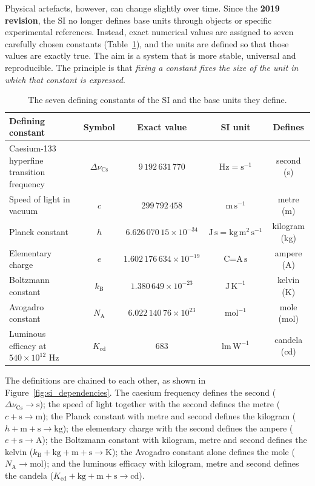 \documentclass[letterpaper,11pt,leqno]{book}
\begin{document}
Physical artefacts, however, can change slightly over time. Since the \textbf{2019 revision}, the SI no longer defines base units through objects or specific experimental references. Instead, exact numerical values are assigned to seven carefully chosen constants (Table~\ref{tab:si_constants}), and the units are defined so that those values are exactly true. The aim is a system that is more stable, universal and reproducible. The principle is that \emph{fixing a constant fixes the size of the unit in which that constant is expressed}.

\begin{table}[!htbp]
\centering
\caption{The seven defining constants of the SI and the base units they define.}
\label{tab:si_constants}
\begin{tabular*}{\textwidth}{p{4.4cm}@{\extracolsep\fill}cccc}
\toprule
Defining constant & Symbol & Exact value & SI unit & Defines \\
\midrule
Caesium-133 hyperfine transition frequency & $\Delta \nu_{\text{Cs}}$ & $9\,192\,631\,770$ & $\text{Hz} = \text{s}^{-1}$ & second (s) \\
Speed of light in vacuum & $c$ & $299\,792\,458$ & $\text{m}\,\text{s}^{-1}$ & metre (m) \\
Planck constant & $h$ & $6.626\,070\,15 \times 10^{-34}$ & $\text{J}\,\text{s} = \text{kg}\,\text{m}^2\,\text{s}^{-1}$ & kilogram (kg) \\
Elementary charge & $e$ & $1.602\,176\,634 \times 10^{-19}$ & $\text{C} = \text{A}\,\text{s}$ & ampere (A) \\
Boltzmann constant & $k_{\text{B}}$ & $1.380\,649 \times 10^{-23}$ & $\text{J}\,\text{K}^{-1}$ & kelvin (K) \\
Avogadro constant & $N_{\text{A}}$ & $6.022\,140\,76 \times 10^{23}$ & $\text{mol}^{-1}$ & mole (mol) \\
Luminous efficacy at $540 \times 10^{12}\text{ Hz}$ & $K_{\text{cd}}$ & $683$ & $\text{lm}\,\text{W}^{-1}$ & candela (cd) \\
\bottomrule
\end{tabular*}
\end{table}

The definitions are chained to each other, as shown in Figure~\ref{fig:si_dependencies}. The caesium frequency defines the second ($\Delta\nu_{\text{Cs}} \to \text{s}$); the speed of light together with the second defines the metre ($c + \text{s} \to \text{m}$); the Planck constant with metre and second defines the kilogram ($h + \text{m} + \text{s} \to \text{kg}$); the elementary charge with the second defines the ampere ($e + \text{s} \to \text{A}$); the Boltzmann constant with kilogram, metre and second defines the kelvin ($k_{\text{B}} + \text{kg} + \text{m} + \text{s} \to \text{K}$); the Avogadro constant alone defines the mole ($N_{\text{A}} \to \text{mol}$); and the luminous efficacy with kilogram, metre and second defines the candela ($K_{\text{cd}} + \text{kg} + \text{m} + \text{s} \to \text{cd}$).
\end{document}
